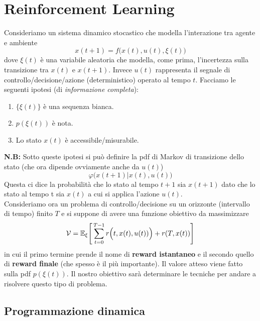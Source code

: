 \section{Reinforcement Learning}
Consideriamo un sistema dinamico stocastico che modella l'interazione tra agente e ambiente
\begin{equation}
x(t+1) = f \big ( x(t), u(t), \xi(t) \big )
\end{equation} dove $\xi(t)$ \`e una variabile aleatoria che modella, come prima, l'incertezza sulla transizione tra $x(t)$ e $x(t+1)$. Invece $u(t)$ rappresenta il segnale di controllo/decisione/azione (deterministico) operato al tempo $t$. Facciamo le seguenti ipotesi (di \textit{informazione completa}):
\begin{enumerate}
\item $\{ \xi(t) \}$ \`e una sequenza bianca.
\item $p(\xi(t))$ \`e nota.
\item Lo stato $x(t)$ \`e accessibile/misurabile.
\end{enumerate}

\textbf{N.B:} Sotto queste ipotesi si pu\`o definire la pdf di Markov di transizione dello stato (che ora dipende ovviamente anche da $u(t)$) 
\begin{equation}
\varphi \big ( x(t+1) | x(t), u(t) \big )
\end{equation} Questa ci dice la probabilit\`a che lo stato al tempo $t+1$ sia $x(t+1)$ dato che lo stato al tempo t sia $x(t)$ a cui si applica l'azione $u(t)$.\\
Consideriamo ora un problema di controllo/decisione su un orizzonte (intervallo di tempo) finito $T$ e si suppone di avere una funzione obiettivo da massimizzare
\begin{equation}
\mathcal{V} = \mathbb{E}_{\xi} \Bigg [ \sum_{t=0}^{T-1} r \Big (t, x(t), u(t)) \Big ) + r(T, x(t)) \Bigg ]
\end{equation} in cui il primo termine prende il nome di \textbf{reward istantaneo} e il secondo quello di \textbf{reward finale} (che spesso \`e il pi\`u importante). Il valore atteso viene fatto sulla pdf $p(\xi(t))$. Il nostro obiettivo sar\`a determinare le tecniche per andare a risolvere questo tipo di problema.

\subsection{Programmazione dinamica}

